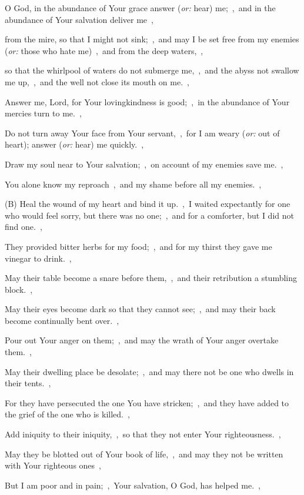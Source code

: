 \documentclass[12pt,twoside,a5paper]{article}
\newcommand{\translationoption}[1]{\emph{or:} #1}
\begin{document}
\begin{normalparskip}
  O God, in the abundance of Your grace answer (\translationoption{hear}) me;~\sep\ and in the abundance of Your salvation deliver me~\sep

  from the mire, so that I might not sink;~\sep\ and may I be set free from my enemies (\translationoption{those who hate me})~\sep\ and from the deep waters,~\sep

  so that the whirlpool of waters do not submerge me,~\sep\ and the abyss not swallow me up,~\sep\ and the well not close its mouth on me.~\sep

  Answer me, Lord, for Your lovingkindness is good;~\sep\ in the abundance of Your mercies turn to me.~\sep

  Do not turn away Your face from Your servant,~\sep\ for I am weary (\translationoption{out of heart}); answer (\translationoption{hear}) me quickly.~\sep

  Draw my soul near to Your salvation;~\sep\ on account of my enemies save me.~\sep

  You alone know my reproach~\sep\ and my shame before all my enemies.~\sep

  (B) Heal the wound of my heart and bind it up.~\sep\ I waited expectantly for one who would feel sorry, but there was no one;~\sep\ and for a comforter, but I did not find one.~\sep

  They provided bitter herbs for my food;~\sep\ and for my thirst they gave me vinegar to drink.~\sep

  May their table become a snare before them,~\sep\ and their retribution a stumbling block.~\sep

  May their eyes become dark so that they cannot see;~\sep\ and may their back become continually bent over.~\sep

  Pour out Your anger on them;~\sep\ and may the wrath of Your anger overtake them.~\sep

  May their dwelling place be desolate;~\sep\ and may there not be one who dwells in their tents.~\sep

  For they have persecuted the one You have stricken;~\sep\ and they have added to the grief of the one who is killed.~\sep

  Add iniquity to their iniquity,~\sep\ so that they not enter Your righteousness.~\sep

  May they be blotted out of Your book of life,~\sep\ and may they not be written with Your righteous ones~\sep

  But I am poor and in pain;~\sep\ Your salvation, O God, has helped me.~\sep


\end{normalparskip}
\end{document}
